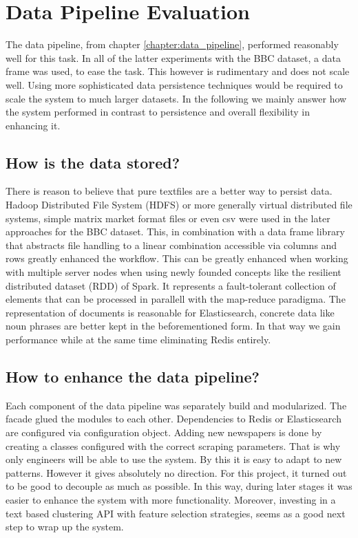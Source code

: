 \section{Data Pipeline Evaluation}
The data pipeline, from chapter \ref{chapter:data_pipeline}, performed reasonably well for this task. In all of the latter experiments with the BBC dataset, a data frame was used, to ease the task. This however is rudimentary and does not scale well. Using more sophisticated data persistence techniques would be required to scale the system to much larger datasets. In the following we mainly answer how the system performed in contrast to persistence and overall flexibility in enhancing it.

\subsection*{How is the data stored?} 
There is reason to believe that pure textfiles are a better way to persist data. Hadoop Distributed File System (HDFS) or more generally virtual distributed file systems, simple matrix market format files or even csv were used in the later approaches for the BBC dataset. This, in combination with a data frame library that abstracts file handling to a linear combination accessible via columns and rows greatly enhanced the workflow. This can be greatly enhanced when working with multiple server nodes when using newly founded concepts like the resilient distributed dataset (RDD) of Spark. It represents a fault-tolerant collection of elements that can be processed in parallell with the map-reduce paradigma. The representation of documents is reasonable for Elasticsearch, concrete data like noun phrases are better kept in the beforementioned form. In that way we gain performance while at the same time eliminating Redis entirely.

\subsection*{How to enhance the data pipeline?} 
Each component of the data pipeline was separately build and modularized. The facade glued the modules to each other. Dependencies to Redis or Elasticsearch are configured via configuration object. Adding new newspapers is done by creating a classes configured with the correct scraping parameters. That is why only engineers will be able to use the system. By this it is easy to adapt to new patterns. However it gives absolutely no direction. For this project, it turned out to be good to decouple as much as possible. In this way, during later stages it was easier to enhance the system with more functionality. Moreover, investing in a text based clustering API with feature selection strategies, seems as a good next step to wrap up the system. 


